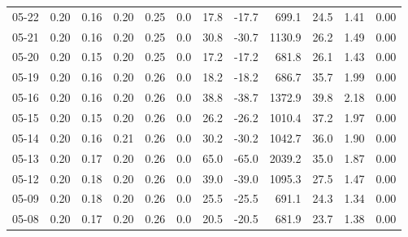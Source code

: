 \begin{threeparttable}
{\begin{tabular}{lrrrrrrrrrrr}
  05-22 &          0.20 &          0.16 &          0.20 &        0.25 &                 0.0 &                17.8 &      -17.7 &               699.1 &             24.5 &            1.41 &                   0.00 \\
  05-21 &          0.20 &          0.16 &          0.20 &        0.25 &                 0.0 &                30.8 &      -30.7 &              1130.9 &             26.2 &            1.49 &                   0.00 \\
  05-20 &          0.20 &          0.15 &          0.20 &        0.25 &                 0.0 &                17.2 &      -17.2 &               681.8 &             26.1 &            1.43 &                   0.00 \\
  05-19 &          0.20 &          0.16 &          0.20 &        0.26 &                 0.0 &                18.2 &      -18.2 &               686.7 &             35.7 &            1.99 &                   0.00 \\
  05-16 &          0.20 &          0.16 &          0.20 &        0.26 &                 0.0 &                38.8 &      -38.7 &              1372.9 &             39.8 &            2.18 &                   0.00 \\
  05-15 &          0.20 &          0.15 &          0.20 &        0.26 &                 0.0 &                26.2 &      -26.2 &              1010.4 &             37.2 &            1.97 &                   0.00 \\
  05-14 &          0.20 &          0.16 &          0.21 &        0.26 &                 0.0 &                30.2 &      -30.2 &              1042.7 &             36.0 &            1.90 &                   0.00 \\
  05-13 &          0.20 &          0.17 &          0.20 &        0.26 &                 0.0 &                65.0 &      -65.0 &              2039.2 &             35.0 &            1.87 &                   0.00 \\
  05-12 &          0.20 &          0.18 &          0.20 &        0.26 &                 0.0 &                39.0 &      -39.0 &              1095.3 &             27.5 &            1.47 &                   0.00 \\
  05-09 &          0.20 &          0.18 &          0.20 &        0.26 &                 0.0 &                25.5 &      -25.5 &               691.1 &             24.3 &            1.34 &                   0.00 \\
  05-08 &          0.20 &          0.17 &          0.20 &        0.26 &                 0.0 &                20.5 &      -20.5 &               681.9 &             23.7 &            1.38 &                   0.00 \\

\end{tabular}}
\end{threeparttable}
